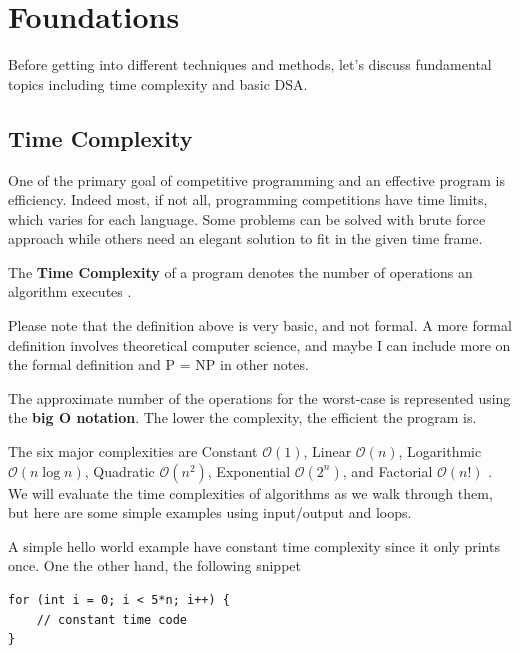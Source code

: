\documentclass[../../main.tex]{subfiles}
\begin{document}
\chapter{Foundations}

Before getting into different techniques and methods, let's discuss
fundamental topics including time complexity and basic DSA.

\section{Time Complexity}

One of the primary goal of competitive programming and an effective
program is efficiency. Indeed most, if not all, programming
competitions have time limits, which varies for each language.
Some problems can be solved with brute force approach while others
need an elegant solution to fit in the given time frame.

\begin{definition}{}{}
The \textbf{Time Complexity} of a program denotes the number of
operations an algorithm executes \cite{CS02-5}.
\end{definition}

Please note that the definition above is very basic, and not formal.
A more formal definition involves theoretical computer science, and
maybe I can include more on the formal definition and P = NP in
other notes.

The approximate number of the operations for the worst-case is
represented using the \textbf{big O notation}. The lower the
complexity, the efficient the program is.

The six major complexities are Constant $\mathcal{O}(1)$, Linear
$\mathcal{O}(n)$, Logarithmic $\mathcal{O}(n \log n)$, Quadratic
$\mathcal{O}(n^2)$, Exponential $\mathcal{O}(2^n)$, and Factorial
$\mathcal{O}(n!)$ \cite{CS02-8}. We will evaluate the time
complexities of algorithms as we walk through them, but here are
some simple examples using input/output and loops.

A simple hello world example have constant time complexity since it
only prints once. One the other hand, the following snippet

\begin{basicbox}
\begin{lstlisting}[style=cppstyle]
for (int i = 0; i < 5*n; i++) {
    // constant time code
}
\end{lstlisting}
\end{basicbox}
\end{document}
